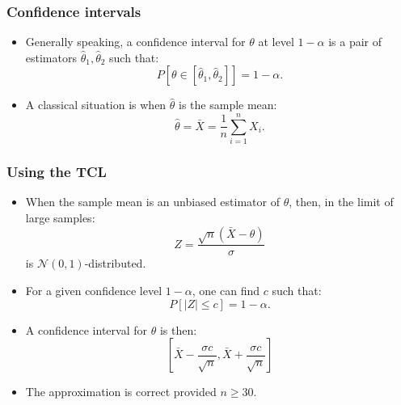 \documentclass[main.tex]{subfiles}
\begin{document}
\begin{frame}
    \frametitle{Confidence intervals}
    \begin{itemize}
        \item<+-> Generally speaking, a confidence interval for $\theta$ at level $1-\alpha$ is a pair of estimators $\hat{\theta}_1, \hat{\theta}_2$ 
        such that:
        \[
        P\left[\theta \in  \left[ \hat{\theta}_1, \hat{\theta}_2\right] \right] = 1-\alpha.
        \]
        \item<+-> A classical situation is when $\hat{\theta}$ is the sample mean:
        \[
        \hat{\theta} = \bar{X} = \frac{1}{n} \sum_{i=1}^n X_i.
        \]
    \end{itemize}
\end{frame}

\begin{frame}
    \frametitle{Using the TCL}
\begin{itemize}
    \item<+-> When the sample mean is an unbiased estimator of $\theta$, then, in the limit of large samples:
    \begin{equation}
        Z = \frac{\sqrt{n}\left( \bar{X} - \theta \right)}{\sigma}
    \end{equation}
    is $\mathcal{N}(0,1)$-distributed.
    \item<+-> For a given confidence level $1-\alpha$, one can find $c$ such that:
    \begin{equation}
        P\left[ \lvert Z \rvert \leq c \right] = 1-\alpha.
    \end{equation}
    \item<+-> A confidence interval for $\theta$ is then:
    \begin{equation}
        \left[ \bar{X} - \frac{\sigma c}{\sqrt{n}}, \bar{X} + \frac{\sigma c}{\sqrt{n}}\right]
    \end{equation}
    \item<+-> The approximation is correct provided $n \geq 30.$
\end{itemize}
\end{frame}
\end{document}
